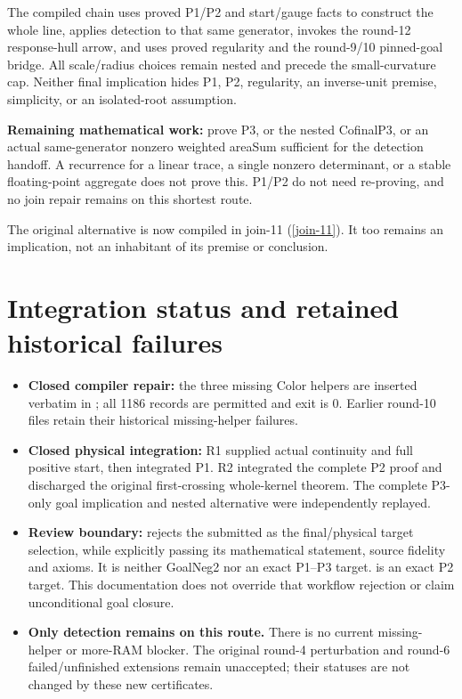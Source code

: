 The compiled chain uses proved P1/P2 and start/gauge facts to construct the whole line, applies detection to that same generator, invokes the round-12 response-hull arrow, and uses proved regularity and the round-9/10 pinned-goal bridge. All scale/radius choices remain nested and precede the small-curvature cap. Neither final implication hides P1, P2, regularity, an inverse-unit premise, simplicity, or an isolated-root assumption.

\textbf{Remaining mathematical work:} prove P3, or the nested CofinalP3, or an actual same-generator nonzero weighted areaSum sufficient for the detection handoff. A recurrence for a linear trace, a single nonzero determinant, or a stable floating-point aggregate does not prove this. P1/P2 do not need re-proving, and no join repair remains on this shortest route.

The original alternative \texttt{} is now compiled in join-11 (\ref{join-11}). It too remains an implication, not an inhabitant of its premise or conclusion.

\section{Integration status and retained historical failures}

\begin{itemize}
\item \textbf{Closed compiler repair:} the three missing Color helpers are inserted verbatim in \texttt{}; all 1186 records are permitted and exit is 0. Earlier round-10 files retain their historical missing-helper failures.
\item \textbf{Closed physical integration:} R1 supplied actual continuity and full positive start, then integrated P1. R2 integrated the complete P2 proof and discharged the original first-crossing whole-kernel theorem. The complete P3-only goal implication and nested alternative were independently replayed.
\item \textbf{Review boundary:} \texttt{} rejects the submitted \texttt{} as the final/physical target selection, while explicitly passing its mathematical statement, source fidelity and axioms. It is neither GoalNeg2 nor an exact P1–P3 target. \texttt{} is an exact P2 target. This documentation does not override that workflow rejection or claim unconditional goal closure.
\item \textbf{Only detection remains on this route.} There is no current missing-helper or more-RAM blocker. The original round-4 perturbation and round-6 failed/unfinished extensions remain unaccepted; their statuses are not changed by these new certificates.
\end{itemize}

